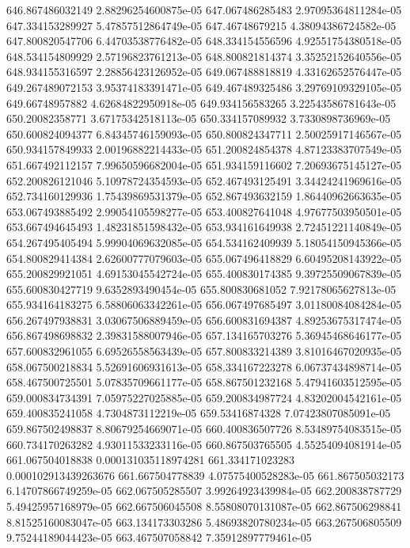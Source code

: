 {646.867486032149 2.88296254600875e-05
647.067486285483 2.97095364811284e-05
647.334153289927 5.47857512864749e-05
647.46748679215 4.38094386724582e-05
647.800820547706 6.44703538776482e-05
648.334154556596 4.92551754380518e-05
648.534154809929 2.57196823761213e-05
648.800821814374 3.35252152640556e-05
648.934155316597 2.28856423126952e-05
649.067488818819 4.33162652576447e-05
649.267489072153 3.95374183391471e-05
649.467489325486 3.29769109329105e-05
649.66748957882 4.62684822950918e-05
649.934156583265 3.22543586781643e-05
650.20082358771 3.67175342518113e-05
650.334157089932 3.7330898736969e-05
650.600824094377 6.84345746159093e-05
650.800824347711 2.50025917146567e-05
650.934157849933 2.00196882214433e-05
651.200824854378 4.87123383707549e-05
651.667492112157 7.99650596682004e-05
651.934159116602 7.20693675145127e-05
652.200826121046 5.10978724354593e-05
652.467493125491 3.34424241969616e-05
652.734160129936 1.75439869531379e-05
652.867493632159 1.86440962663635e-05
653.067493885492 2.99054105598277e-05
653.400827641048 4.97677503950501e-05
653.667494645493 1.48231851598432e-05
653.934161649938 2.72451221140849e-05
654.267495405494 5.99904069632085e-05
654.534162409939 5.18054150945366e-05
654.800829414384 2.62600777079603e-05
655.067496418829 6.60495208143922e-05
655.200829921051 4.69153045542724e-05
655.400830174385 9.39725509067839e-05
655.600830427719 9.6352893490454e-05
655.800830681052 7.92178065627813e-05
655.934164183275 6.58806063342261e-05
656.067497685497 3.01180084084284e-05
656.267497938831 3.03067506889459e-05
656.600831694387 4.89253675317474e-05
656.867498698832 2.39831588007946e-05
657.134165703276 5.36945468646177e-05
657.600832961055 6.69526558563439e-05
657.800833214389 3.81016467020935e-05
658.067500218834 5.52691606931613e-05
658.334167223278 6.06737434898714e-05
658.467500725501 5.07835709661177e-05
658.867501232168 5.47941603512595e-05
659.000834734391 7.05975227025885e-05
659.200834987724 4.83202004542161e-05
659.400835241058 4.7304873112219e-05
659.53416874328 7.07423807085091e-05
659.867502498837 8.80679254669071e-05
660.400836507726 8.53489754083515e-05
660.734170263282 4.93011533233116e-05
660.867503765505 4.55254094081914e-05
661.067504018838 0.000131035118974281
661.334171023283 0.000102913439263676
661.667504778839 4.07575400528283e-05
661.867505032173 6.14707866749259e-05
662.067505285507 3.99264923439984e-05
662.200838787729 5.49425957168979e-05
662.667506045508 8.55808070131087e-05
662.867506298841 8.81525160083047e-05
663.134173303286 5.48693820780234e-05
663.267506805509 9.75244189044423e-05
663.467507058842 7.35912897779461e-05
}
